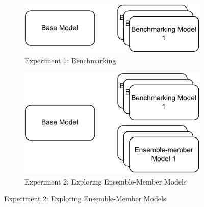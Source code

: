 \documentclass{article}
\begin{document}
\begin{figure}[htbp]
    \centering
    \begin{subfigure}[htb]{0.80\textwidth}
        \centering
        \includegraphics[width=\textwidth ]{figures/exp_1}
        \caption{Experiment 1: Benchmarking}\label{fig:exp:exp_1}
    \end{subfigure}

    \vspace{2em}
    
    \begin{subfigure}[htb]{0.80\textwidth}
        \centering
        \includegraphics[width=\textwidth]{figures/exp_2}
        \caption{Experiment 2: Exploring Ensemble-Member Models}\label{fig:exp:exp_2}
    \end{subfigure}
    
    \vspace{2em}
    

\end{figure}
\end{document}
